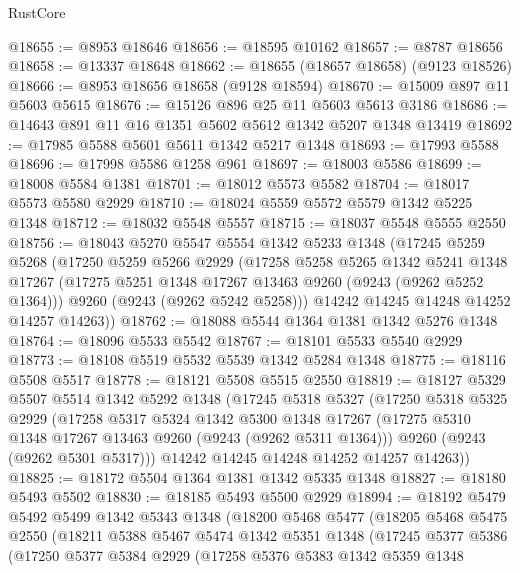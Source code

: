 \begin{lexlean}{RustCore}
\begin{coremodule}
@18655 := @8953 @18646
@18656 := @18595 @10162
@18657 := @8787 @18656
@18658 := @13337 @18648
@18662 := @18655 (@18657 @18658) (@9123 @18526)
@18666 := @8953 @18656 @18658 (@9128 @18594)
@18670 := @15009 @897 @11 @5603 @5615
@18676 := @15126 @896 @25 @11 @5603 @5613 @3186
@18686 := @14643 @891 @11 @16 @1351 @5602 @5612 @1342 @5207 @1348 @13419
@18692 := @17985 @5588 @5601 @5611 @1342 @5217 @1348
@18693 := @17993 @5588
@18696 := @17998 @5586 @1258 @961
@18697 := @18003 @5586
@18699 := @18008 @5584 @1381
@18701 := @18012 @5573 @5582
@18704 := @18017 @5573 @5580 @2929
@18710 := @18024 @5559 @5572 @5579 @1342 @5225 @1348
@18712 := @18032 @5548 @5557
@18715 := @18037 @5548 @5555 @2550
@18756 := @18043
    @5270
    @5547
    @5554
    @1342
    @5233
    @1348
    (@17245
      @5259
      @5268
      (@17250
        @5259
        @5266
        @2929
        (@17258
          @5258
          @5265
          @1342
          @5241
          @1348
          @17267
          (@17275 @5251 @1348 @17267 @13463 @9260 (@9243 (@9262 @5252 @1364)))
          @9260
          (@9243 (@9262 @5242 @5258)))
        @14242
        @14245
        @14248
        @14252
        @14257
        @14263))
@18762 := @18088 @5544 @1364 @1381 @1342 @5276 @1348
@18764 := @18096 @5533 @5542
@18767 := @18101 @5533 @5540 @2929
@18773 := @18108 @5519 @5532 @5539 @1342 @5284 @1348
@18775 := @18116 @5508 @5517
@18778 := @18121 @5508 @5515 @2550
@18819 := @18127
    @5329
    @5507
    @5514
    @1342
    @5292
    @1348
    (@17245
      @5318
      @5327
      (@17250
        @5318
        @5325
        @2929
        (@17258
          @5317
          @5324
          @1342
          @5300
          @1348
          @17267
          (@17275 @5310 @1348 @17267 @13463 @9260 (@9243 (@9262 @5311 @1364)))
          @9260
          (@9243 (@9262 @5301 @5317)))
        @14242
        @14245
        @14248
        @14252
        @14257
        @14263))
@18825 := @18172 @5504 @1364 @1381 @1342 @5335 @1348
@18827 := @18180 @5493 @5502
@18830 := @18185 @5493 @5500 @2929
@18994 := @18192
    @5479
    @5492
    @5499
    @1342
    @5343
    @1348
    (@18200
      @5468
      @5477
      (@18205
        @5468
        @5475
        @2550
        (@18211
          @5388
          @5467
          @5474
          @1342
          @5351
          @1348
          (@17245
            @5377
            @5386
            (@17250
              @5377
              @5384
              @2929
              (@17258
                @5376
                @5383
                @1342
                @5359
                @1348

\end{coremodule}
\end{lexlean}
